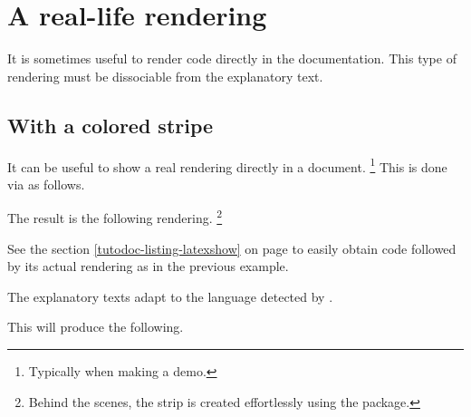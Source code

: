 \documentclass{tutodoc}
\begin{document}
\section{A real-life rendering}
\label{tutodoc-showcase}

It is sometimes useful to render code directly in the documentation. This type of rendering must be dissociable from the explanatory text.



\subsection{With a colored stripe}

\begin{tdocexa} 
    It can be useful to show a real rendering directly in a document.
    \footnote{
        Typically when making a demo.
    }
    This is done via  as follows.


    The result is the following rendering.
    \footnote{
        Behind the scenes, the strip is created effortlessly using the  package.
    }
\end{tdocexa}




\smallskip

\begin{tdocrem}
    See the section \ref{tutodoc-listing-latexshow} on page \pageref{tutodoc-listing-latexshow} to easily obtain code followed by its actual rendering as in the previous example.
\end{tdocrem}


\begin{tdocnote}
    The explanatory texts adapt to the language detected by \thisproj.
\end{tdocnote}




\begin{tdocexa}
    \leavevmode


    This will produce the following.

    \medskip

    
\end{tdocexa}
\end{document}
